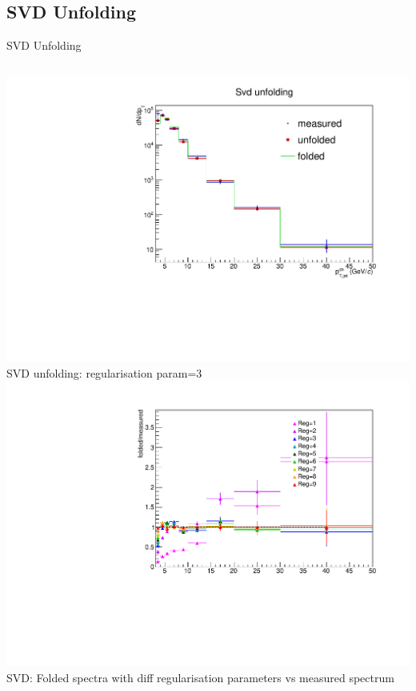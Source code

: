 \documentclass[xcolor={usenames,dvipsnames}, aspectratio=169]{beamer}
\begin{document}
\subsection{SVD Unfolding}

\begin{frame}{SVD Unfolding}
\begin{columns}
\includegraphics[width=\textwidth]{img/pPb/SvdReg3.pdf}\\
\small
SVD unfolding: regularisation param=3
\centering
\includegraphics[width=\textwidth]{img/pPb/SvdFoldMeas.pdf}\\
\small
SVD: Folded spectra with diff regularisation parameters vs measured spectrum
\end{columns}
\end{frame}
\end{document}
